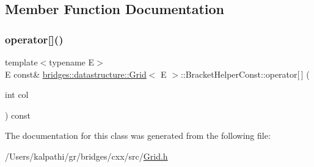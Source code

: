 \subsection{Member Function Documentation}
\mbox{\label{classbridges_1_1datastructure_1_1_grid_1_1_bracket_helper_const_a3a0571d419200f98e525441e16bb707c}} 
\subsubsection{\texorpdfstring{operator[]()}{operator[]()}}
{\footnotesize\ttfamily template$<$typename E$>$ \\
E const\& \mbox{\hyperlink{classbridges_1_1datastructure_1_1_grid}{bridges\+::datastructure\+::\+Grid}}$<$ E $>$\+::Bracket\+Helper\+Const\+::operator\mbox{[}$\,$\mbox{]} (\begin{DoxyParamCaption}\item[{int}]{col }\end{DoxyParamCaption}) const\hspace{0.3cm}{\ttfamily [inline]}}



The documentation for this class was generated from the following file\+:\begin{DoxyCompactItemize}
\item 
/\+Users/kalpathi/gr/bridges/cxx/src/\mbox{\hyperlink{_grid_8h}{Grid.\+h}}\end{DoxyCompactItemize}
